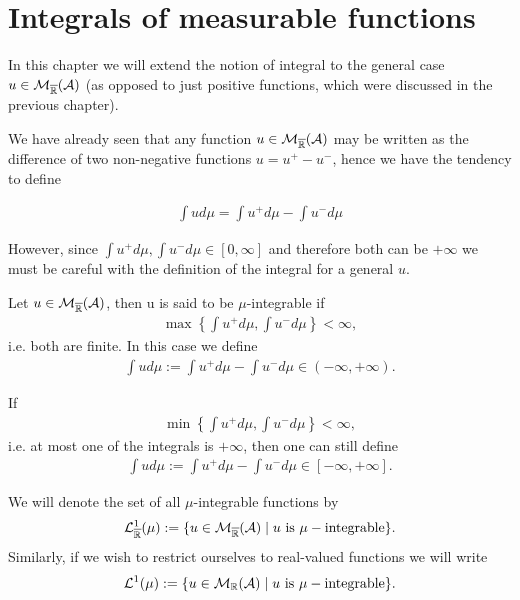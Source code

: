 

\chapter{Integrals of measurable functions}

In this chapter we will extend the notion of integral to the general case $u \in \mathcal{M}_{\overline{\mathbb{R}}}(\mathcal{A})$ (as opposed to just positive functions, which were discussed in the previous chapter).

We have already seen that any function $u \in \mathcal{M}_{\overline{\mathbb{R}}}(\mathcal{A})$ may be written as the difference of two non-negative functions $u = u^+ - u^-$, hence we have the tendency to define

\begin{align*}
	\int u d\mu = \int u^+ d\mu - \int u^- d \mu
\end{align*}

However, since $\int u^+ d\mu, \int u^- d\mu \in [0, \infty]$ and therefore both can be $+\infty$ we must be careful with the definition of the integral for a general $u$.


\begin{dfn}[$\mu$-integrable]
	\label{dfn:mu-integrable}
	Let $u \in \mathcal{M}_{\overline{\mathbb{R}}}(\mathcal{A})$, then u is said to be $\mu$-integrable if
	\begin{align}
		\max\left\{ \int u^+ d\mu, \int u^- d\mu \right\} < \infty,
	\end{align}
	i.e. both are finite. In this case we define
	\begin{align}
		\int u d\mu := \int u^+ d\mu - \int u^- d\mu \in (-\infty, +\infty).
	\end{align}
\end{dfn}

\begin{remark}
	If
	\begin{align*}
		\min\left\{ \int u^+ d\mu, \int u^- d\mu \right\} < \infty,
	\end{align*}
	i.e. at most one of the integrals is $+\infty$, then one can still define
	\begin{align*}
	\int u d\mu := \int u^+ d\mu - \int u^- d\mu \in [-\infty, +\infty].
	\end{align*}
\end{remark}

We will denote the set of all $\mu$-integrable functions by
\begin{align}
	\mathcal{L}^1_{\overline{\mathbb{R}}}(\mu) := \{u \in \mathcal{M}_{\overline{\mathbb{R}}}(\mathcal{A}) \mid u \text{ is } \mu-\text{integrable}\}.
\end{align}
Similarly, if we wish to restrict ourselves to real-valued functions we will write
\begin{align}
\mathcal{L}^1(\mu) := \{u \in \mathcal{M}_{\mathbb{R}}(\mathcal{A}) \mid u \text{ is } \mu-\text{integrable}\}.
\end{align}

